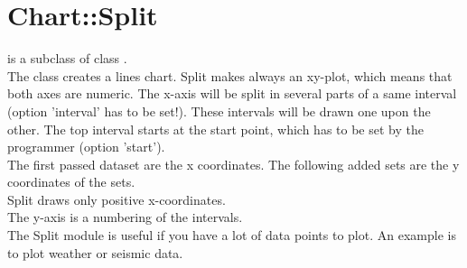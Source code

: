 %
%
\section{Chart::Split}
\begin{Description} 
 is a subclass of class .\\
The class  creates a lines chart. 
Split makes always an xy-plot, which means that both axes are numeric. 
The x-axis will be split in several parts of a same interval (option 'interval' has to be set!).
These intervals will be drawn one upon the other. 
The top interval starts at the start point, 
which has to be set by the programmer (option 'start'). \\
The first passed dataset are the x coordinates. 
The following added sets are the y coordinates of the sets.\\
Split draws only positive x-coordinates.\\
The y-axis is a numbering of the intervals.\\
The Split module is useful if you have a lot of data points to plot. An example is to plot
weather or seismic data.
\end{Description}


